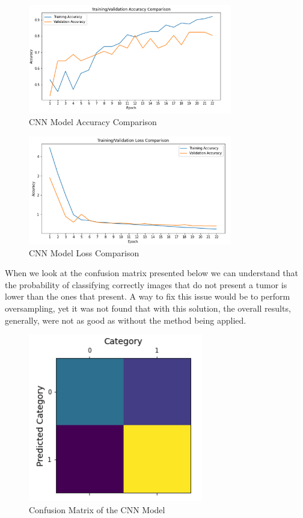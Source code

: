 \documentclass[conference]{IEEEtran}
\begin{document}
\begin{figure}[H]
    \centering
    \includegraphics[width=3.5in]{cnn-epoch-accuracy.png}
    \caption{CNN Model Accuracy Comparison}\label{fig:fig12}
\end{figure}

\begin{figure}[H]
    \centering
    \includegraphics[width=3.5in]{cnn-epoch-loss.png}
    \caption{CNN Model Loss Comparison}
    \label{fig:fig13}
\end{figure}

When we look at the confusion matrix presented below we can understand that the probability of classifying correctly images that do not present a tumor is lower than the ones that present. A way to fix this issue would be to perform oversampling, yet it was not found that with this solution, the overall results, generally, were not as good as without the method being applied.

\begin{figure}[H]
    \centering
    \includegraphics[width=3in]{cnn-confusion-matrix.png}
    \caption{Confusion Matrix of the CNN Model}\label{fig:fig6}
\end{figure}
\end{document}

